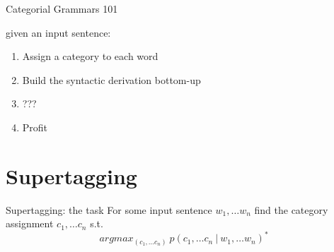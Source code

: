 \documentclass{beamer}
\begin{document}
\begin{frame}{Categorial Grammars 101}
    \smaller
    
    \begin{block}{}
    given an input sentence:
        \begin{enumerate}
            \item Assign a category to each word
            \item Build the syntactic derivation bottom-up
            \item ???
            \item Profit
        \end{enumerate}
    \end{block}\vfill
    
    \noindent
    
\end{frame}

\section{Supertagging}


\begin{frame}{Supertagging: the task}
    \smaller
    For some input sentence $w_1, \dots w_n$ find the category assignment $c_1, \dots c_n$ s.t.
        \[
            argmax_{(c_1, \dots c_n)}~ p(c_1, \dots c_n ~ | ~ w_1, \dots w_n)^*
        \]
        
    \vfill
\end{frame}
\end{document}
